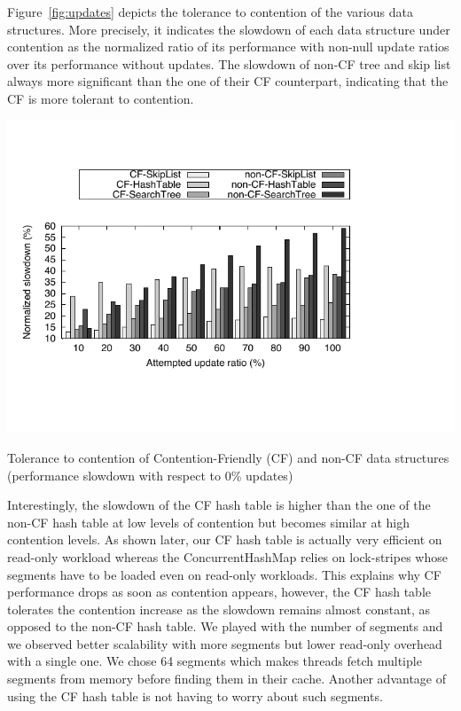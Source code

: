 Figure~\ref{fig:updates} depicts the tolerance to contention of the various data structures.
More precisely, it indicates the slowdown of each data structure under contention as the normalized 
ratio of its performance with non-null update ratios over its performance without updates.
The slowdown of non-CF tree and skip list always more significant than the one of their CF counterpart, 
indicating that the CF is more tolerant to contention.
%
\begin{floatingfigure}{9cm}
\includegraphics[scale=0.9,clip=true,viewport=10 50 280 230]{CF-general/experiments/pdf/updates}
\vspace{-1em}
\caption{\footnotesize{Tolerance to contention of Contention-Friendly (CF) and non-CF data structures (performance slowdown with respect to 0\% updates)\label{fig:updates}}}
\end{floatingfigure}
%
Interestingly, the slowdown of the CF hash table is higher than the one of the non-CF hash table at low 
levels of contention but becomes similar at high contention levels. 
As shown later, our CF hash table is actually very efficient on read-only workload whereas the ConcurrentHashMap relies on lock-stripes whose segments have to be loaded even on read-only workloads. 
This explains why CF performance drops as soon as contention appears, however, the CF hash table tolerates the contention increase as the slowdown remains almost constant, as opposed to the non-CF hash table.
We played with the number of segments and we observed better scalability with more segments but lower read-only overhead with a single one. We chose 64 segments which makes threads fetch multiple segments from memory before finding them in their cache. Another advantage of using  the CF hash table is not having to worry about such segments.

